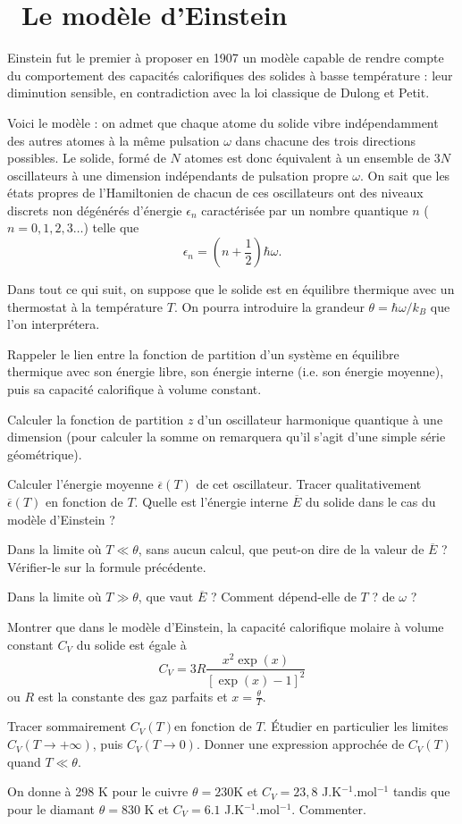 \documentclass[utf8, 11pt]{feuille}
\begin{document}
\section{\hard~Le modèle d'Einstein}

Einstein fut le premier à proposer en 1907 un modèle capable de rendre compte du comportement des capacités calorifiques des solides à basse température : leur diminution sensible, en contradiction avec la loi classique de Dulong et Petit.

Voici le modèle : on admet que chaque atome du solide vibre indépendamment des autres atomes à la même pulsation $\omega $ dans chacune des trois directions possibles. Le solide, formé de $N$ atomes est donc équivalent à un ensemble de
$3N$ oscillateurs à une dimension indépendants de pulsation propre $\omega$. On sait que les états propres de l'Hamiltonien de chacun de ces oscillateurs ont des niveaux discrets non dégénérés d'énergie $\epsilon_n$ caractérisée par un nombre quantique $n$ ($n=0,1,2,3\ldots$) telle que
$$
  \epsilon_n=(n+\frac{1}{2}) \hbar \omega.
$$

Dans tout ce qui suit, on suppose que le solide est en équilibre thermique avec un thermostat à la température $T$. On pourra introduire la grandeur $\theta=\hbar \omega/k_B$ que l'on interprétera.

\question
Rappeler le lien entre la fonction de partition d'un système en équilibre thermique avec son énergie libre, son énergie interne (i.e. son énergie moyenne), puis sa capacité calorifique à volume constant.

\question Calculer la fonction de partition $z$ d'un oscillateur harmonique quantique à une dimension (pour calculer la somme on remarquera qu'il s'agit d'une simple série géométrique).

\question Calculer l'énergie moyenne $\overline \epsilon (T)$ de cet oscillateur. Tracer qualitativement $\overline \epsilon (T)$ en fonction de $T$. Quelle est l'énergie interne $\overline E$ du solide dans le cas du modèle d'Einstein ?

\question Dans la limite où $T \ll \theta$, sans aucun calcul, que peut-on dire de la valeur de $\overline E$ ? Vérifier-le sur la formule précédente.

\question Dans la limite où $T \gg \theta$, que vaut $\overline E$ ? Comment dépend-elle de $T$ ? de $\omega $ ? 

\question Montrer que dans le modèle d'Einstein, la capacité calorifique molaire à volume constant $C_V$ du solide est égale à
$$
 C_V=3R \frac{x^2 \exp ( x)}{[\exp (x)-1]^2}
$$
ou $R$ est la constante des gaz parfaits et $\displaystyle{x=\frac{\theta}{T}}$.

\question
Tracer sommairement $C_V(T)$en fonction de $T$. \'Etudier en particulier les limites $C_V(T \to + \infty)$, puis $C_V(T \to 0)$. Donner une expression approchée de $C_V(T)$ quand $T \ll \theta$.

\question
On donne à 298 K pour le cuivre $\theta=230$K et $C_V=23,8$ J.K$^{-1}$.mol$^{-1}$ tandis que pour le diamant $\theta=830$ K et $C_V=6.1$ J.K$^{-1}$.mol$^{-1}$. Commenter.
\end{document}
